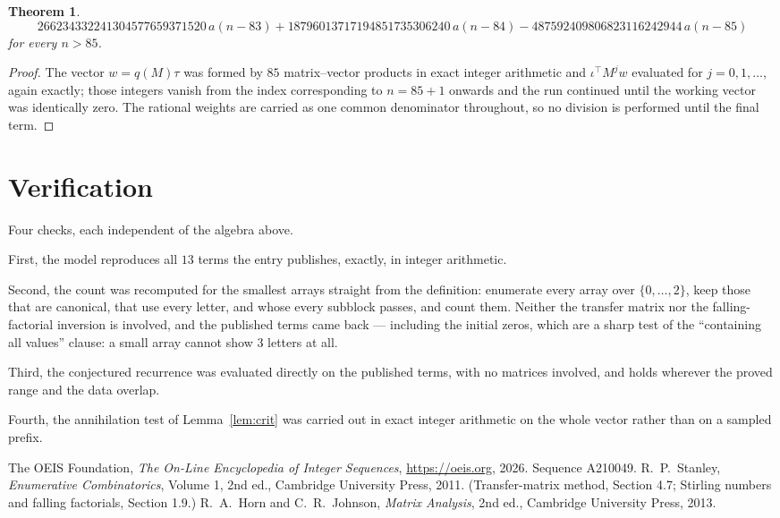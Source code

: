 \documentclass[11pt,a4paper]{article}
\theoremstyle{plain}
\newtheorem{theorem}{Theorem}
\theoremstyle{definition}
\begin{document}
\begin{theorem}
\[266234332241304577659371520\,a(n-83) + 18796013717194851735306240\,a(n-84) - 487592409806823116242944\,a(n-85)
\]
for every $n>85$.
\end{theorem}

\begin{proof}
The vector $w=q(M)\tau$ was formed by $85$ matrix--vector products in exact integer
arithmetic and $\iota^{\!\top}M^{j}w$ evaluated for $j=0,1,\dots$, again exactly; those
integers vanish from the index corresponding to $n=85+1$ onwards and the run continued
until the working vector was identically zero. The rational weights are carried as one common
denominator throughout, so no division is performed until the final term.
\end{proof}

\section{Verification}

Four checks, each independent of the algebra above.

First, the model reproduces all $13$ terms the entry publishes, exactly, in integer
arithmetic.

Second, the count was recomputed for the smallest arrays straight from the definition:
enumerate every array over $\{0,\dots,2\}$, keep those that are canonical, that use every
letter, and whose every subblock passes, and count them. Neither the transfer matrix nor the
falling-factorial inversion is involved, and the published terms came back --- including the
initial zeros, which are a sharp test of the ``containing all values'' clause: a small array
cannot show $3$ letters at all.

Third, the conjectured recurrence was evaluated directly on the published terms, with no
matrices involved, and holds wherever the proved range and the data overlap.

Fourth, the annihilation test of Lemma~\ref{lem:crit} was carried out in exact integer
arithmetic on the whole vector rather than on a sampled prefix.

\begin{thebibliography}{9}
 The OEIS Foundation, \emph{The On-Line Encyclopedia of Integer
Sequences}, \url{https://oeis.org}, 2026. Sequence A210049.
 R.~P.~Stanley, \emph{Enumerative Combinatorics}, Volume 1, 2nd ed.,
Cambridge University Press, 2011. (Transfer-matrix method, Section 4.7; Stirling numbers and
falling factorials, Section 1.9.)
 R.~A.~Horn and C.~R.~Johnson, \emph{Matrix Analysis}, 2nd ed., Cambridge
University Press, 2013.
\end{thebibliography}
\end{document}
